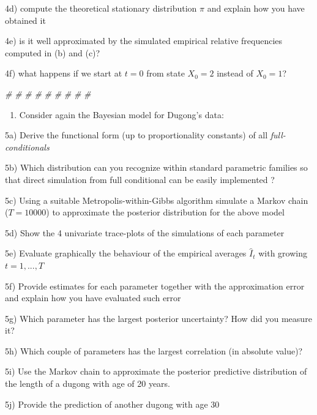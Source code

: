 \documentclass[]{article}
\newenvironment{Shaded}{\begin{snugshade}}{\end{snugshade}}
\newcommand{\CommentTok}[1]{\textcolor[rgb]{0.56,0.35,0.01}{\textit{#1}}}
\providecommand{\tightlist}{%
  \setlength{\itemsep}{0pt}\setlength{\parskip}{0pt}}
\begin{document}
4d) compute the theoretical stationary distribution \(\pi\) and explain
how you have obtained it

4e) is it well approximated by the simulated empirical relative
frequencies computed in (b) and (c)?

4f) what happens if we start at \(t=0\) from state \(X_0=2\) instead of
\(X_0=1\)?

\begin{Shaded}
\begin{Highlighting}[]
\CommentTok{#}
\CommentTok{#}
\CommentTok{#}
\CommentTok{#}
\CommentTok{#}
\CommentTok{#}
\CommentTok{#}
\CommentTok{#}
\CommentTok{#}
\end{Highlighting}
\end{Shaded}

\newpage

\begin{enumerate}
\def\labelenumi{\arabic{enumi})}
\setcounter{enumi}{4}
\tightlist
\item
  Consider again the Bayesian model for Dugong's data:
\end{enumerate}

5a) Derive the functional form (up to proportionality constants) of all
\emph{full-conditionals}

5b) Which distribution can you recognize within standard parametric
families so that direct simulation from full conditional can be easily
implemented ?

5c) Using a suitable Metropolis-within-Gibbs algorithm simulate a Markov
chain (\(T=10000\)) to approximate the posterior distribution for the
above model

5d) Show the 4 univariate trace-plots of the simulations of each
parameter

5e) Evaluate graphically the behaviour of the empirical averages
\(\hat{I}_t\) with growing \(t=1,...,T\)

5f) Provide estimates for each parameter together with the approximation
error and explain how you have evaluated such error

5g) Which parameter has the largest posterior uncertainty? How did you
measure it?

5h) Which couple of parameters has the largest correlation (in absolute
value)?

5i) Use the Markov chain to approximate the posterior predictive
distribution of the length of a dugong with age of 20 years.

5j) Provide the prediction of another dugong with age 30
\end{document}
